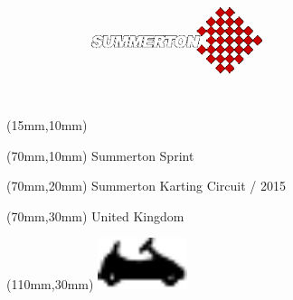 \null\newpage
\begin{textblock*}{50mm}(15mm,10mm)%
\includegraphics[width=50mm]{LG/SUM.png}
\end{textblock*}
\begin{textblock*}{130mm}(70mm,10mm)%
{\fontsize{20}{20}\selectfont Summerton Sprint}\\
\end{textblock*}
\begin{textblock*}{120mm}(70mm,20mm)%
{\fontsize{16}{16}\selectfont Summerton Karting Circuit / 2015}\\
\end{textblock*}
\begin{textblock*}{120mm}(70mm,30mm)%
{\fontsize{12}{12}\selectfont United Kingdom}
\end{textblock*}
\begin{textblock*}{30mm}(110mm,30mm)%
\centering
\includegraphics[height=15mm]{icons/kart.pdf}
\end{textblock*}
